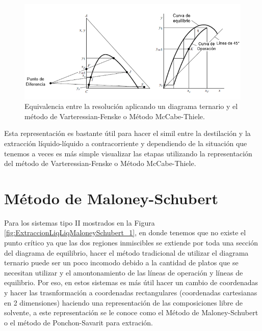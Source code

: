 \documentclass[11pt]{book}
\begin{document}
\begin{figure}[H]
    \centering
    \includegraphics{img/LiquidoLiquido/ExtraccionLiqLiqMetodoMcCabeThiele.PNG}
    \caption{Equivalencia entre la resolución aplicando un diagrama ternario y el método de Varteressian-Fenske o Método McCabe-Thiele.}
    \label{fig:ExtraccionLiqLiqMcCabeThiele_1}
\end{figure}

Esta representación es bastante útil para hacer el simil entre la destilación y la extracción líquido-líquido a contracorriente y dependiendo de la situación que tenemos a veces es más simple visualizar las etapas utilizando la representación del método de Varteressian-Fenske o Método McCabe-Thiele.

\section{Método de Maloney-Schubert}

Para los sistemas tipo II mostrados en la Figura \ref{fig:ExtraccionLiqLiqMaloneySchubert_1}, en donde tenemos que no existe el punto crítico ya que las dos regiones inmiscibles se extiende por toda una sección del diagrama de equilibrio, hacer el método tradicional de utilizar el diagrama ternario puede ser un poco incomodo debido a la cantidad de platos que se necesitan utilizar y el amontonamiento de las líneas de operación y líneas de equilibrio. Por eso, en estos sistemas es más útil hacer un cambio de coordenadas y hacer las trasnformación a coordenadas rectangulares (coordenadas cartesianas en 2 dimensiones) haciendo una representación de las composiciones libre de solvente, a este representación se le conoce como el Método de Maloney-Schubert o el método de Ponchon-Savarit para extración. 
\end{document}
